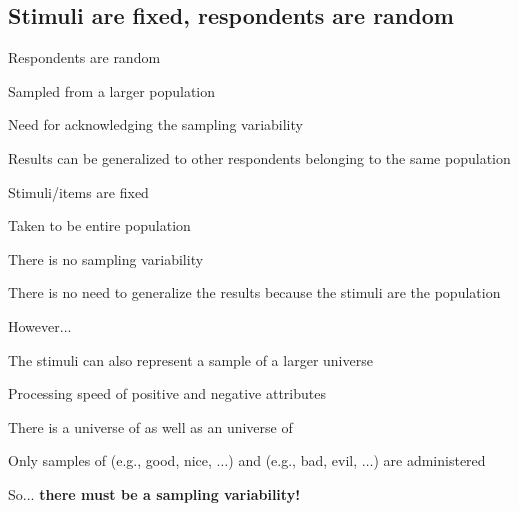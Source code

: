 \documentclass[compress]{beamer}
\begin{document}
\subsection{Stimuli are fixed, respondents are random}

\begin{frame}
	
	\begin{block}{Respondents are random}
		
		Sampled from a larger population
		
		\vspace{1.5mm}
		\pause
		Need for acknowledging the sampling variability 
		
		\vspace{1.5mm}
		\pause
		Results can be generalized to other respondents belonging to the same population
	\end{block}

\vspace{3mm}
\pause
\begin{block}{Stimuli/items are fixed}
	
	Taken to be entire population 
	
		\vspace{1.5mm}
	\pause
	There is no sampling variability
	
		\vspace{1.5mm}
	\pause
	There is no need to generalize the results because the stimuli are the population
	
\end{block}
\end{frame}

\begin{frame}{However...}
	
	The stimuli can also represent a sample of a larger universe
	
	\vspace{3mm}
	\pause
	
	\begin{exampleblock}{Processing speed of positive and negative attributes}
		
		\pause
		\vspace{1.5mm}
		There is a universe of {} as well as an universe of {}
		
		\pause
		\vspace{1.5mm}
		Only samples of {} (e.g., good, nice, $\ldots$) and {} (e.g., bad, evil, $\ldots$) are administered 
		
		\pause
		\vspace{2.5mm}
		So... \textbf{there must be a sampling variability!} 
	\end{exampleblock}
\end{frame}
\end{document}

